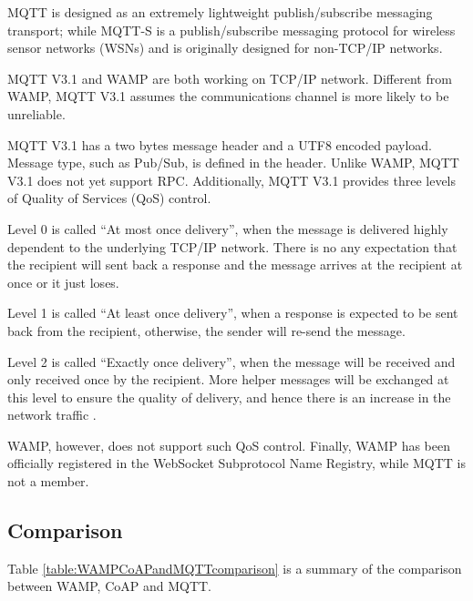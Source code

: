 MQTT is designed as an extremely lightweight publish/subscribe messaging transport; while MQTT-S is a publish/subscribe messaging protocol for wireless sensor networks (WSNs) and is originally designed for non-TCP/IP networks.

MQTT V3.1 and WAMP are both working on TCP/IP network. Different from WAMP, MQTT V3.1 assumes the communications channel is more likely to be unreliable.

MQTT V3.1 has a two bytes message header and a UTF8 encoded payload.
Message type, such as Pub/Sub, is defined in the header. Unlike WAMP, MQTT V3.1 does not yet support RPC. Additionally, MQTT V3.1 provides three levels of Quality of Services (QoS) control.

Level 0 is called ``At most once delivery'', when the message is delivered highly dependent to the underlying TCP/IP network. There is no any expectation that the recipient will sent back a response and the message arrives at the recipient at once or it just loses.

Level 1 is called ``At least once delivery'', when a response is expected to be sent back from the recipient, otherwise, the sender will re-send the message.

Level 2 is called ``Exactly once delivery'', when the message will be received and only received once by the recipient. More helper messages will be exchanged at this level to ensure the quality of delivery, and hence there is an increase in the network traffic \cite{MQTTV31ProtocolSpec}.

WAMP, however, does not support such QoS control. Finally, WAMP has been officially registered in the WebSocket Subprotocol Name Registry, while MQTT is not a member.

\subsection{Comparison}
Table \ref{table:WAMPCoAPandMQTTcomparison} is a summary of the comparison between WAMP, CoAP and MQTT.

